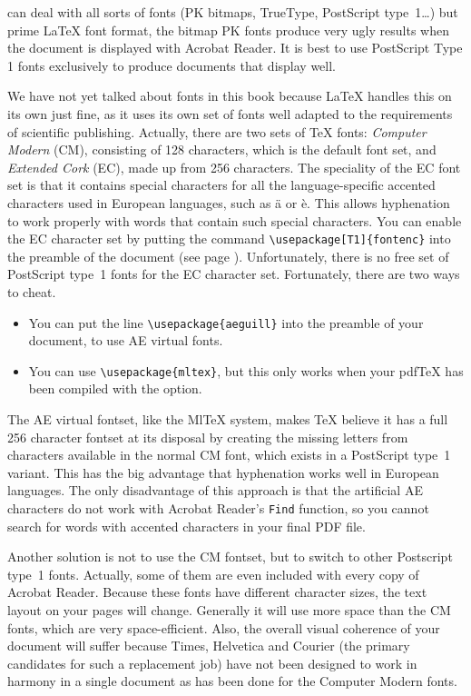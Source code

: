  can deal with all sorts of fonts (PK bitmaps, TrueType,
PostScript type~1\dots) but prime \LaTeX{} font format, the bitmap PK
fonts produce very ugly results when the document is displayed
with Acrobat Reader. It is best to use PostScript Type 1 fonts
exclusively to produce documents that display well.

We have not yet talked about fonts in this book because \LaTeX{}
handles this on its own just fine, as it uses its own set of fonts well
adapted to the requirements of scientific publishing.
Actually, there are two sets of \TeX{} fonts: 
\emph{Computer Modern} (CM), consisting of 128 characters, which is the
default font set, and \emph{Extended Cork} (EC), made up from 256
characters. The speciality of the EC font set is that it contains
special characters for all the language-specific accented characters
used in European languages, such as
\"a or \`e. This allows hyphenation to work properly with words
that contain such special characters. You can enable the EC character
set by putting the command \verb+\usepackage[T1]{fontenc}+ into the
preamble of the document (see page \pageref{fontenc}).
Unfortunately, there is no free set of PostScript type~1 fonts
for the EC character set. Fortunately, there are two ways to cheat.
\begin{itemize}
\item You can put the line \verb+\usepackage{aeguill}+ into the
  preamble of your document, to use AE virtual fonts. 
\item You can use \verb+\usepackage{mltex}+, but this only works when
  your pdf\TeX{} has been compiled with the  option.
\end{itemize}
The AE virtual fontset, like the {Ml\TeX} system, makes \TeX{} believe
it has a full 256 character fontset at its disposal by creating the
missing letters from characters available in the normal CM font, which
exists in a PostScript type~1 variant. This has the big advantage that
hyphenation works well in European languages. 
The only disadvantage of this approach is that the artificial AE
characters do not work with Acrobat Reader's 
\texttt{Find} function, so you cannot search for words with accented
characters in your final PDF file.

Another solution is not to use the CM fontset, but to switch to other
Postscript type~1 fonts. Actually, some of them are even included with
every copy of Acrobat Reader. Because these fonts have different
character sizes, the text layout on your pages will change. Generally
it will use more space than the CM fonts, which are very space-efficient. 
Also, the overall visual coherence of your document will
suffer because Times, Helvetica and Courier (the primary candidates
for such a replacement job) have not been designed to work in harmony in
a single document as has been done for the Computer Modern fonts.
 
